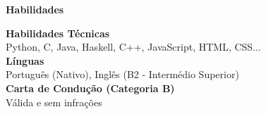 \noindent\textbf{Habilidades}
\noindent\hrulefill
\vspace{0.25em}
\begin{adjustwidth}{1.5em}{0em}
\textbf{Habilidades Técnicas}\\
Python, C, Java, Haskell, C++, JavaScript, HTML, CSS...
\vspace{0.5em}
\\
\textbf{Línguas}\\
Português (Nativo), Inglês (B2 - Intermédio Superior)
\vspace{0.5em}
\\
\textbf{Carta de Condução (Categoria B)}\\
Válida e sem infrações
\end{adjustwidth}
\vspace{0.25em}